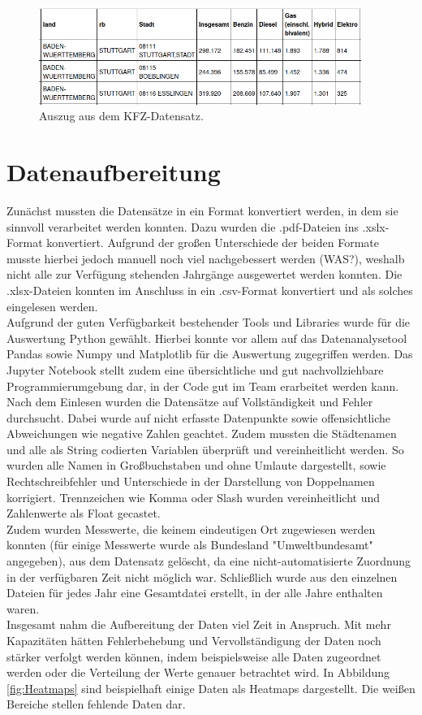 \documentclass[11pt,a4paper,oneside,german]{article}
\begin{document}
	\begin{figure}[h!]
		\centering
		\includegraphics[width=10.5cm]{BeispielKFZ.png}
		\caption{Auszug aus dem KFZ-Datensatz.}
		\label{fig:BeispielKFZ}
	\end{figure}
	
	\section{Datenaufbereitung}
	
	Zunächst mussten die Datensätze in ein Format konvertiert werden, in dem sie sinnvoll verarbeitet werden konnten. Dazu wurden die .pdf-Dateien ins .xslx-Format konvertiert. Aufgrund der großen Unterschiede der beiden Formate musste hierbei jedoch manuell noch viel nachgebessert werden (WAS?), weshalb nicht alle zur Verfügung stehenden Jahrgänge ausgewertet werden konnten. Die .xlsx-Dateien konnten im Anschluss in ein .csv-Format konvertiert und als solches eingelesen werden.\\
	Aufgrund der guten Verfügbarkeit bestehender Tools und Libraries wurde für die Auswertung Python gewählt. Hierbei konnte vor allem auf das Datenanalysetool Pandas sowie Numpy und Matplotlib für die Auswertung zugegriffen werden. Das Jupyter Notebook stellt zudem eine übersichtliche und gut nachvollziehbare Programmierumgebung dar, in der Code gut im Team erarbeitet werden kann.\\
	Nach dem Einlesen wurden die Datensätze auf Vollständigkeit und Fehler durchsucht. Dabei wurde auf nicht erfasste Datenpunkte sowie offensichtliche Abweichungen wie negative Zahlen geachtet. Zudem mussten die Städtenamen und alle als String codierten Variablen überprüft und vereinheitlicht werden. So wurden alle Namen in Großbuchstaben und ohne Umlaute dargestellt, sowie Rechtschreibfehler und Unterschiede in der Darstellung von Doppelnamen korrigiert. Trennzeichen wie Komma oder Slash wurden vereinheitlicht und Zahlenwerte als Float gecastet. \\
	Zudem wurden Messwerte, die keinem eindeutigen Ort zugewiesen werden konnten (für einige Messwerte wurde als Bundesland "Umweltbundesamt" angegeben), aus dem Datensatz gelöscht, da eine nicht-automatisierte Zuordnung in der verfügbaren Zeit nicht möglich war. Schließlich wurde aus den einzelnen Dateien für jedes Jahr eine Gesamtdatei erstellt, in der alle Jahre enthalten waren. \\
	Insgesamt nahm die Aufbereitung der Daten viel Zeit in Anspruch. Mit mehr Kapazitäten hätten Fehlerbehebung und Vervollständigung der Daten noch stärker verfolgt werden können, indem beispielsweise alle Daten zugeordnet werden oder die Verteilung der Werte genauer betrachtet wird. In Abbildung \ref{fig:Heatmaps} sind beispielhaft einige Daten als Heatmaps dargestellt. Die weißen Bereiche stellen fehlende Daten dar.
	
\end{document}

